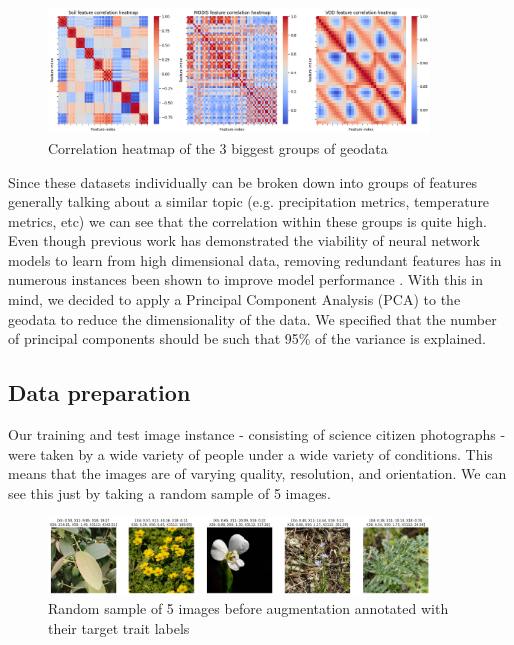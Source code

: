 \documentclass[12pt,a4paper,oneside]{article}
\begin{document}
\begin{figure}[!h]
    \centering
    \includegraphics[width=0.9\textwidth]{assets/corr_hm.png}
    \caption{Correlation heatmap of the 3 biggest groups of geodata}
\end{figure}

Since these datasets individually can be broken down into groups of features generally talking about a similar topic (e.g. precipitation metrics, temperature metrics, etc) we can see that the correlation within these groups is quite high. Even though previous work \cite{DBLP:journals/corr/abs-2007-00062} has demonstrated the viability of neural network models to learn from high dimensional data, removing redundant features has in numerous instances been shown to improve model performance \cite{chen2022survey}. With this in mind, we decided to apply a Principal Component Analysis (PCA) to the geodata to reduce the dimensionality of the data. We specified that the number of principal components should be such that 95\% of the variance is explained.  

\subsection{Data preparation}

Our training and test image instance - consisting of science citizen photographs - were taken by a wide variety of people under a wide variety of conditions. This means that the images are of varying quality, resolution, and orientation. We can see this just by taking a random sample of 5 images.
\begin{figure}[!h]
    \centering
    \includegraphics[width=0.9\textwidth]{assets/before_aug_img.png}
    \caption{Random sample of 5 images before augmentation annotated with their target trait labels}
\end{figure}
\end{document}
